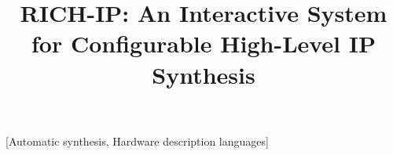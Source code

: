 \documentclass{sig-alternate}
\begin{document}
%

\title{RICH-IP: An Interactive System for Configurable High-Level IP Synthesis}
%
%

%
\maketitle
[Automatic synthesis, Hardware description languages]








\end{document}
